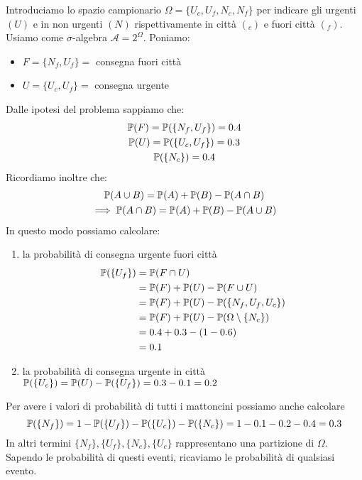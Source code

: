 Introduciamo lo spazio campionario $\Omega =\{U_{c} ,U_{f} ,N_{c} ,N_{f}\}$ per indicare gli urgenti $( U)$ e in non urgenti $( N)$ rispettivamente in città $(_{c})$ e fuori città $(_{f})$. Usiamo come $\sigma $-algebra $\mathcal{A} =2^{\Omega }$. Poniamo:
\begin{itemize}
	\item $F=\{N_{f} ,U_{f}\} =$ consegna fuori città
	\item $U=\{U_{c} ,U_{f}\} =$ consegna urgente
\end{itemize}
Dalle ipotesi del problema sappiamo che:
\begin{gather*}
	\mathbb{P}( F) =\mathbb{P}(\{N_{f} ,U_{f}\}) =0.4\\
	\mathbb{P}( U) =\mathbb{P}(\{U_{c} ,U_{f}\}) =0.3\\
	\mathbb{P}(\{N_{c}\}) =0.4
\end{gather*}
Ricordiamo inoltre che:
\begin{gather*}
	\mathbb{P}( A\cup B) =\mathbb{P}( A) +\mathbb{P}( B) -\mathbb{P}( A\cap B)\\
	\implies  \mathbb{P}( A\cap B) =\mathbb{P}( A) +\mathbb{P}( B) -\mathbb{P}( A\cup B)
\end{gather*}
In questo modo possiamo calcolare:
\begin{enumerate}
	\item la probabilità di consegna urgente fuori città
	\begin{align*}
		\mathbb{P}(\{U_{f}\}) & =\mathbb{P}( F\cap U)\\
		& =\mathbb{P}( F) +\mathbb{P}( U) -\mathbb{P}( F\cup U)\\
		& =\mathbb{P}( F) +\mathbb{P}( U) -\mathbb{P}(\{N_{f} ,U_{f} ,U_{c}\})\\
		& =\mathbb{P}( F) +\mathbb{P}( U) -\mathbb{P}( \Omega \setminus \{N_{c}\})\\
		& =0.4+0.3-( 1-0.6)\\
		& =0.1
	\end{align*}
	\item la probabilità di consegna urgente in città
	$\mathbb{P}(\{U_{c}\}) =\mathbb{P}( U) -\mathbb{P}(\{U_{f}\}) =0.3-0.1=0.2$
\end{enumerate}
\begin{oss}
	Per avere i valori di probabilità di tutti i mattoncini possiamo anche calcolare
	\begin{equation*}
		\mathbb{P}(\{N_{f}\}) =1-\mathbb{P}(\{U_{f}\}) -\mathbb{P}(\{U_{c}\}) -\mathbb{P}(\{N_{c}\}) =1-0.1-0.2-0.4=0.3
	\end{equation*}
	In altri termini $\{N_{f}\} ,\{U_{f}\} ,\{N_{c}\} ,\{U_{c}\}$ rappresentano una partizione di $\Omega $. Sapendo le probabilità di questi eventi, ricaviamo le probabilità di qualsiasi evento.
\end{oss}

